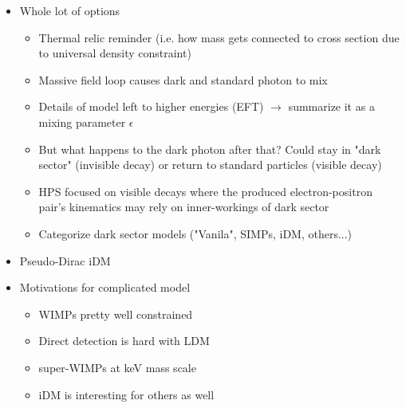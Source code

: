 \begin{itemize}
      \item Whole lot of options
            \begin{itemize}
                  \item Thermal relic reminder (i.e. how mass gets connected to cross section due to universal density constraint) \cite{thermal-freezeout-diagram-1996}
                  \item Massive field loop causes dark and standard photon to mix
                  \item Details of model left to higher energies (EFT) $\rightarrow$ summarize it as a mixing parameter $\epsilon$ \cite{kinetic-mixing-1986}
                  \item But what happens to the dark photon after that? Could stay in "dark sector" (invisible decay) or return to standard particles (visible decay)
                  \item HPS focused on visible decays where the produced electron-positron pair's kinematics may rely on inner-workings of dark sector
                  \item Categorize dark sector models ("Vanila", SIMPs, iDM, others...)
            \end{itemize}
      \item Pseudo-Dirac iDM
      \item Motivations for complicated model
            \begin{itemize}
                  \item WIMPs pretty well constrained \cite{supercdms-2018,damic-2020,xenon1t-2018}
                  \item Direct detection is hard with LDM \cite{ldmconstraints-2019}
                  \item super-WIMPs at keV mass scale \cite{superwimps-2008}
                  \item iDM is interesting for others as well \cite{darkseaquest-2018}
            \end{itemize}
\end{itemize}


